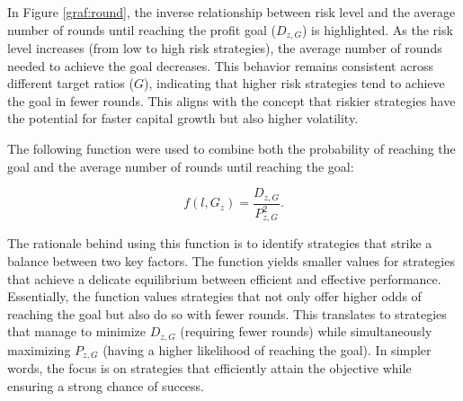 \documentclass[11pt,twoside]{article}
\numberwithin{Theorem}{section}
\numberwithin{Definition}{section}
\numberwithin{Lemma}{section}
\numberwithin{Algorithm}{section}
\numberwithin{equation}{section}
\begin{document}
In Figure \ref{graf:round}, the inverse relationship between risk level and the average number of rounds until reaching the profit goal ($D_{z,G}$) is highlighted. As the risk level increases (from low to high risk strategies), the average number of rounds needed to achieve the goal decreases. This behavior remains consistent across different target ratios ($G$), indicating that higher risk strategies tend to achieve the goal in fewer rounds. This aligns with the concept that riskier strategies have the potential for faster capital growth but also higher volatility.

The following function were used to combine both the probability of reaching the goal and the average number of rounds until reaching the goal:

\begin{equation}
    f(l, G_z) = \frac{D_{z,G}}{P_{z,G}^{2}}.
\end{equation}

The rationale behind using this function is to identify strategies that strike a balance between two key factors. The function yields smaller values for strategies that achieve a delicate equilibrium between efficient and effective performance. Essentially, the function values strategies that not only offer higher odds of reaching the goal but also do so with fewer rounds. This translates to strategies that manage to minimize \(D_{z,G}\) (requiring fewer rounds) while simultaneously maximizing \(P_{z,G}\) (having a higher likelihood of reaching the goal). In simpler words, the focus is on strategies that efficiently attain the objective while ensuring a strong chance of success.
\end{document}
